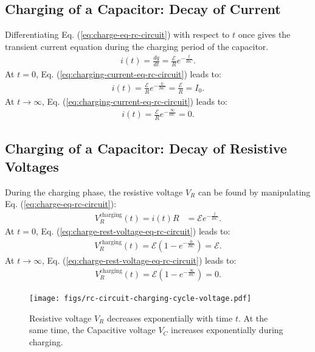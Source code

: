 \documentclass[12pt,b4paper]{article}
\begin{document}
\subsection{Charging of a Capacitor: Decay of Current}
Differentiating Eq. (\ref{eq:charge-eq-rc-circuit}) with respect to $t$ once gives the transient current equation during the charging period of the capacitor.
\begin{align}
    i(t)=\frac{dq}{dt}=\frac{\mathcal{E}}{R}e^{\displaystyle-\frac{t}{RC}}.\label{eq:charging-current-eq-rc-circuit}
\end{align}
At $t=0$, Eq. (\ref{eq:charging-current-eq-rc-circuit}) leads to:
\begin{align*}
    i(t)=\frac{\mathcal{E}}{R}e^{\displaystyle-\frac{0}{RC}}=\frac{\mathcal{E}}{R}=I_0.
\end{align*}
At $t\to\infty$, Eq. (\ref{eq:charging-current-eq-rc-circuit}) leads to:
\begin{align*}
    i(t)=\frac{\mathcal{E}}{R}e^{\displaystyle-\frac{\infty}{RC}}=0.
\end{align*}
\subsection{Charging of a Capacitor: Decay of Resistive Voltages}
During the charging phase, the resistive voltage $V_R$ can be found by manipulating Eq. (\ref{eq:charge-eq-rc-circuit}):
\begin{align}
    V_R^\text{charging}(t)=i(t)R&=\mathcal{E}e^{\displaystyle-\frac{t}{RC}}.\label{eq:charge-rest-voltage-eq-rc-circuit}
\end{align}
At $t=0$, Eq. (\ref{eq:charge-rest-voltage-eq-rc-circuit}) leads to:
\begin{align*}
    V_R^\text{charging}(t)=\mathcal{E}\left(1-e^{\displaystyle-\frac{0}{RC}}\right)=\mathcal{E}.
\end{align*}
At $t\to\infty$, Eq. (\ref{eq:charge-rest-voltage-eq-rc-circuit}) leads to:
\begin{align*}
    V_R^\text{charging}(t)=\mathcal{E}\left(1-e^{\displaystyle-\frac{\infty}{RC}}\right)=0.
\end{align*}
\begin{figure}[H]
    \centering
    \texttt{[image: figs/rc-circuit-charging-cycle-voltage.pdf]}
    \caption{Resistive voltage $V_R$ decreases exponentially with time $t$. At the same time, the Capacitive voltage $V_C$ increases exponentially during charging.}
    \label{fig:rc-circuit-charging-cycle-voltage}
\end{figure}
\end{document}
